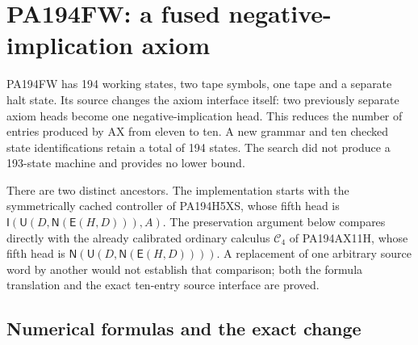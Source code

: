 \section{PA194FW: a fused negative-implication axiom}
\label{sec:pa194fw}
\providecommand{\FWI}{\mathsf I}
\providecommand{\FWU}{\mathsf U}
\providecommand{\FWM}{\mathsf M}
\providecommand{\FWE}{\mathsf E}
\providecommand{\FWN}{\mathsf N}
\providecommand{\FWC}{\mathcal C}
\providecommand{\FWPRA}{\mathrm{iPRA}}
\newtheorem{fwtheorem}{Theorem}[section]
\newtheorem{fwlemma}[fwtheorem]{Lemma}

PA194FW has 194 working states, two tape symbols, one tape and a separate
halt state.  Its source changes the axiom interface itself: two previously
separate axiom heads become one negative-implication head.  This reduces
the number of entries produced by AX from eleven to ten.  A new grammar
and ten checked state identifications retain a total of 194 states.  The
search did not produce a 193-state machine and provides no lower bound.

There are two distinct ancestors.  The implementation starts with the
symmetrically cached controller of PA194H5XS, whose fifth head is
$\FWI(\FWU(D,\FWN(\FWE(H,D))),A)$.  The preservation argument
below compares directly with the already calibrated ordinary calculus
$\FWC_4$ of PA194AX11H, whose fifth head is
$\FWN(\FWU(D,\FWN(\FWE(H,D))))$.  A replacement of one arbitrary
source word by another would not establish that comparison; both the
formula translation and the exact ten-entry source interface are proved.

\subsection{Numerical formulas and the exact change}

